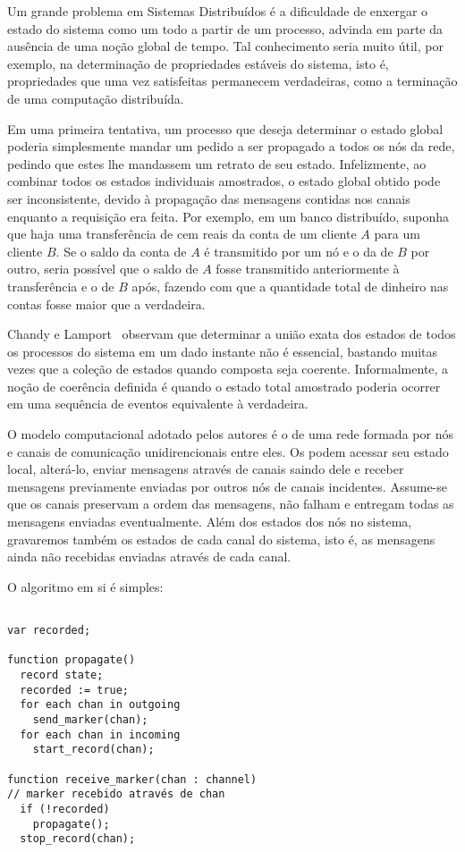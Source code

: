 Um grande problema em Sistemas Distribuídos é a dificuldade de
enxergar o estado do sistema como um todo a partir de um processo,
advinda em parte da ausência de uma noção global de tempo. Tal
conhecimento seria muito útil, por exemplo, na determinação de
propriedades estáveis do sistema, isto é, propriedades que uma vez
satisfeitas permanecem verdadeiras, como a terminação de uma
computação distribuída.

Em uma primeira tentativa, um processo que deseja determinar o estado
global poderia simplesmente mandar um pedido a ser propagado a todos
os nós da rede, pedindo que estes lhe mandassem um retrato de seu
estado. Infelizmente, ao combinar todos os estados individuais
amostrados, o estado global obtido pode ser inconsistente, devido à
propagação das mensagens contidas nos canais enquanto a requisição era
feita. Por exemplo, em um banco distribuído, suponha que haja uma
transferência de cem reais da conta de um cliente $A$ para um cliente
$B$. Se o saldo da conta de $A$ é transmitido por um nó e o da de $B$
por outro, seria possível que o saldo de $A$ fosse transmitido
anteriormente à transferência e o de $B$ após, fazendo com que a
quantidade total de dinheiro nas contas fosse maior que a verdadeira.

Chandy e Lamport~\cite{chandyl85} observam que determinar a união
exata dos estados de todos os processos do sistema em um dado instante
não é essencial, bastando muitas vezes que a coleção de estados quando
composta seja coerente. Informalmente, a noção de coerência definida é
quando o estado total amostrado poderia ocorrer em uma sequência de
eventos equivalente à verdadeira.

O modelo computacional adotado pelos autores é o de uma rede formada
por nós e canais de comunicação unidirencionais entre eles. Os podem
acessar seu estado local, alterá-lo, enviar mensagens através de
canais saindo dele e receber mensagens previamente enviadas por outros
nós de canais incidentes. Assume-se que os canais preservam a ordem
das mensagens, não falham e entregam todas as mensagens enviadas
eventualmente. Além dos estados dos nós no sistema, gravaremos também
os estados de cada canal do sistema, isto é, as mensagens ainda não
recebidas enviadas através de cada canal.

O algoritmo em si é simples:

\begin{lstlisting}[caption={Algoritmo de Chandy e Lamport para amostra
  de estado global consistente.}]

var recorded;

function propagate()
  record state;
  recorded := true;
  for each chan in outgoing
    send_marker(chan);
  for each chan in incoming
    start_record(chan);

function receive_marker(chan : channel) 
// marker recebido através de chan
  if (!recorded)
    propagate();
  stop_record(chan);
\end{lstlisting}

